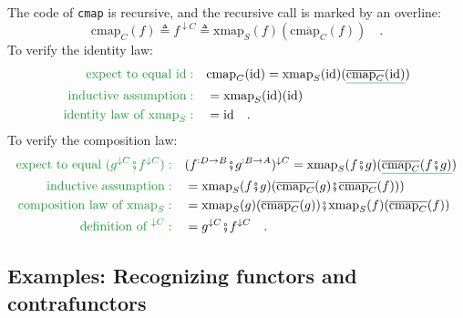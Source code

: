 The code of \lstinline!cmap! is recursive, and the recursive call
is marked by an overline: 
\[
\text{cmap}_{C}(f)\triangleq f^{\downarrow C}\triangleq\text{xmap}_{S}(f)(\overline{\text{cmap}_{C}}(f))\quad.
\]
To verify the identity law:
\begin{align*}
{\color{greenunder}\text{expect to equal }\text{id}:}\quad & \text{cmap}_{C}(\text{id})=\text{xmap}_{S}(\text{id})(\gunderline{\overline{\text{cmap}_{C}}(\text{id})})\\
{\color{greenunder}\text{inductive assumption}:}\quad & =\text{xmap}_{S}(\text{id})(\text{id})\\
{\color{greenunder}\text{identity law of }\text{xmap}_{S}:}\quad & =\text{id}\quad.
\end{align*}
To verify the composition law:
\begin{align*}
{\color{greenunder}\text{expect to equal }(g^{\downarrow C}\bef f^{\downarrow C}):}\quad & (f^{:D\rightarrow B}\bef g^{:B\rightarrow A})^{\downarrow C}=\text{xmap}_{S}(f\bef g)(\gunderline{\overline{\text{cmap}_{C}}(f\bef g)})\\
{\color{greenunder}\text{inductive assumption}:}\quad & =\text{xmap}_{S}(f\bef g)(\overline{\text{cmap}_{C}}(g)\bef\overline{\text{cmap}_{C}}(f)))\\
{\color{greenunder}\text{composition law of }\text{xmap}_{S}:}\quad & =\text{xmap}_{S}(g)(\overline{\text{cmap}_{C}}(g))\bef\text{xmap}_{S}(f)(\overline{\text{cmap}_{C}}(f))\\
{\color{greenunder}\text{definition of }^{\downarrow C}:}\quad & =g^{\downarrow C}\bef f^{\downarrow C}\quad.
\end{align*}


\subsection{Examples: Recognizing functors and contrafunctors\label{subsec:Solved-examples:-How-to-recognize-functors}}

